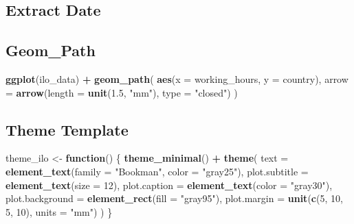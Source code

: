 \documentclass[]{book}
\newenvironment{Shaded}{\begin{snugshade}}{\end{snugshade}}
\newcommand{\KeywordTok}[1]{\textcolor[rgb]{0.13,0.29,0.53}{\textbf{#1}}}
\newcommand{\DataTypeTok}[1]{\textcolor[rgb]{0.13,0.29,0.53}{#1}}
\newcommand{\DecValTok}[1]{\textcolor[rgb]{0.00,0.00,0.81}{#1}}
\newcommand{\FloatTok}[1]{\textcolor[rgb]{0.00,0.00,0.81}{#1}}
\newcommand{\StringTok}[1]{\textcolor[rgb]{0.31,0.60,0.02}{#1}}
\newcommand{\ControlFlowTok}[1]{\textcolor[rgb]{0.13,0.29,0.53}{\textbf{#1}}}
\newcommand{\OperatorTok}[1]{\textcolor[rgb]{0.81,0.36,0.00}{\textbf{#1}}}
\newcommand{\NormalTok}[1]{#1}
\theoremstyle{definition}
\theoremstyle{definition}
\theoremstyle{definition}
\theoremstyle{remark}
\begin{document}
\subsection{Extract Date}\label{extract-date}

\begin{Shaded}
\end{Shaded}

\subsection{Geom\_Path}\label{geom_path}

\begin{Shaded}
\begin{Highlighting}[]
\KeywordTok{ggplot}\NormalTok{(ilo_data) }\OperatorTok{+}
\StringTok{  }\KeywordTok{geom_path}\NormalTok{(}
            \KeywordTok{aes}\NormalTok{(}\DataTypeTok{x =}\NormalTok{ working_hours, }\DataTypeTok{y =}\NormalTok{ country),}
            \DataTypeTok{arrow =} \KeywordTok{arrow}\NormalTok{(}\DataTypeTok{length =} \KeywordTok{unit}\NormalTok{(}\FloatTok{1.5}\NormalTok{, }\StringTok{"mm"}\NormalTok{), }\DataTypeTok{type =} \StringTok{"closed"}\NormalTok{)}
\NormalTok{)}
\end{Highlighting}
\end{Shaded}

\subsection{Theme Template}\label{theme-template}

\begin{Shaded}
\begin{Highlighting}[]
\NormalTok{theme_ilo <-}\StringTok{ }\ControlFlowTok{function}\NormalTok{() \{}
  \KeywordTok{theme_minimal}\NormalTok{() }\OperatorTok{+}
\StringTok{  }\KeywordTok{theme}\NormalTok{(}
    \DataTypeTok{text =} \KeywordTok{element_text}\NormalTok{(}\DataTypeTok{family =} \StringTok{"Bookman"}\NormalTok{, }\DataTypeTok{color =} \StringTok{"gray25"}\NormalTok{),}
    \DataTypeTok{plot.subtitle =} \KeywordTok{element_text}\NormalTok{(}\DataTypeTok{size =} \DecValTok{12}\NormalTok{),}
    \DataTypeTok{plot.caption =} \KeywordTok{element_text}\NormalTok{(}\DataTypeTok{color =} \StringTok{"gray30"}\NormalTok{),}
    \DataTypeTok{plot.background =} \KeywordTok{element_rect}\NormalTok{(}\DataTypeTok{fill =} \StringTok{"gray95"}\NormalTok{),}
    \DataTypeTok{plot.margin =} \KeywordTok{unit}\NormalTok{(}\KeywordTok{c}\NormalTok{(}\DecValTok{5}\NormalTok{, }\DecValTok{10}\NormalTok{, }\DecValTok{5}\NormalTok{, }\DecValTok{10}\NormalTok{), }\DataTypeTok{units =} \StringTok{"mm"}\NormalTok{)}
\NormalTok{  )}
\NormalTok{\}}
\end{Highlighting}
\end{Shaded}
\end{document}
